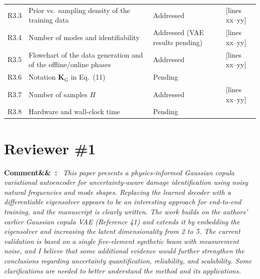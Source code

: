 \documentclass[11pt]{article}
\newenvironment{rcomment}[1]{\par\bigskip\noindent\textbf{Comment\ifx&#1&\else\ #1\fi:}\ \itshape}{\par}
\newenvironment{response}{\par\smallskip\noindent\color{resp}\textbf{Response:}\ }{\par}
\newcommand{\tbd}[1]{\textcolor{note}{\textsf{[#1]}}}
\newcommand{\lines}[1]{\tbd{lines #1}}
\begin{document}
{\begin{longtable}{p{1.55cm}p{6.0cm}p{3.0cm}p{3.6cm}}
R3.3 & Prior vs.\ sampling density of the training data & Addressed & \lines{xx--yy} \\
R3.4 & Number of modes and identifiability & Addressed (VAE results pending) & \lines{xx--yy} \\
R3.5 & Flowchart of the data generation and of the offline/online phases & Addressed & \lines{xx--yy} \\
R3.6 & Notation $\mathbf{K}_{\mathrm{G}}$ in Eq.~(11) & Pending & \\
R3.7 & Number of samples $H$ & Addressed & \lines{xx--yy} \\
R3.8 & Hardware and wall-clock time & Pending & \\
\bottomrule
\end{longtable}
}

\section{Reviewer \#1}

\begin{rcomment}{}
This paper presents a physics-informed Gaussian copula variational autoencoder for uncertainty-aware damage
identification using noisy natural frequencies and mode shapes. Replacing the learned decoder with a differentiable
eigensolver appears to be an interesting approach for end-to-end training, and the manuscript is clearly written. The work
builds on the authors' earlier Gaussian copula VAE (Reference 41) and extends it by embedding the eigensolver and
increasing the latent dimensionality from 2 to 5. The current validation is based on a single five-element synthetic
beam with measurement noise, and I believe that some additional evidence would further strengthen the conclusions
regarding uncertainty quantification, reliability, and scalability. Some clarifications are needed to better understand
the method and its applications.
\end{rcomment}
%
%	
%	
%	
\end{document}
